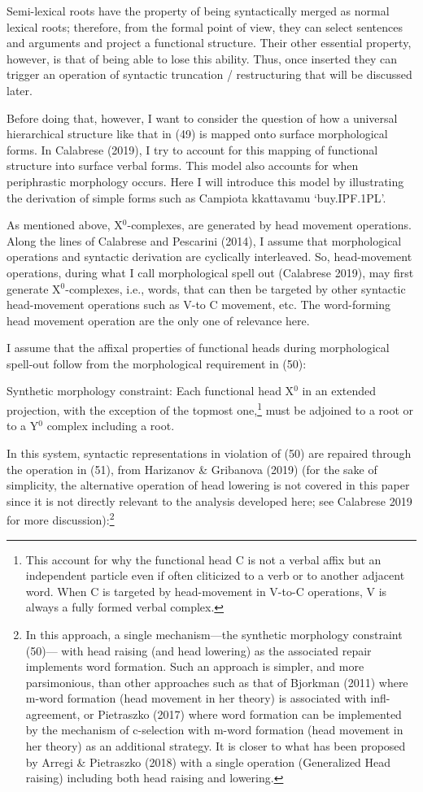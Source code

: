 \documentclass[output=paper,colorlinks,citecolor=brown,
]{langscibook}
\begin{document}
Semi-lexical roots have the property of being syntactically merged as normal lexical roots; therefore, from the formal point of view, they can select sentences and arguments and project a functional structure.  Their other essential property, however, is that of being able to lose this ability. Thus, once inserted they can trigger an operation of syntactic truncation / restructuring that will be discussed later. 

Before doing that, however, I want to consider  the question of how a universal hierarchical structure like that in (49) is mapped onto surface morphological forms. In Calabrese (2019), I try to account for this mapping of functional structure into surface verbal forms. This model also accounts for when periphrastic morphology occurs. Here I will introduce this model by illustrating the derivation of simple forms such as Campiota kkattavamu ‘buy.IPF.1PL’.

As mentioned above, X$^0$-complexes, are generated by head movement operations. Along the lines of Calabrese and Pescarini (2014), I assume that morphological operations and syntactic derivation are cyclically interleaved. So, head-movement operations, during what I call morphological spell out (Calabrese 2019), may first generate X$^0$-complexes, i.e., words, that can then be targeted by other syntactic head-movement operations such as V-to C movement, etc. The word-forming head movement operation are the only one of relevance here.  

I assume that the affixal properties of functional heads during morphological spell-out follow from the morphological requirement in (50):

\ea Synthetic morphology constraint:       
Each functional head X$^0$ in an extended projection, with the exception of the topmost one,\footnote{This account for why the functional head C is not a verbal affix but an independent particle even if often cliticized to a verb or to another adjacent word.  When C is targeted by head-movement in V-to-C operations, V is always a fully formed verbal complex.} must be adjoined to a root or to a Y$^0$ complex including a root.
\z

In this system, syntactic representations in violation of (50) are repaired through the operation in (51), from Harizanov \& Gribanova (2019) (for the sake of simplicity, the alternative operation of head lowering is not covered in this paper since it is not directly relevant to the analysis developed here; see Calabrese 2019 for more discussion):\footnote{In this approach, a single mechanism—the synthetic morphology constraint (50)— with head raising (and head lowering) as the associated repair implements word formation. Such an approach is simpler, and more parsimonious, than other approaches such as that of Bjorkman (2011) where m-word formation (head movement in her theory) is associated with infl-agreement, or Pietraszko (2017) where word formation can be implemented by the mechanism of c-selection with m-word formation (head movement in her theory) as an additional strategy. It is closer to what has been proposed by Arregi \& Pietraszko (2018)  with a single operation (Generalized Head raising) including both head raising and lowering.}
\end{document}
